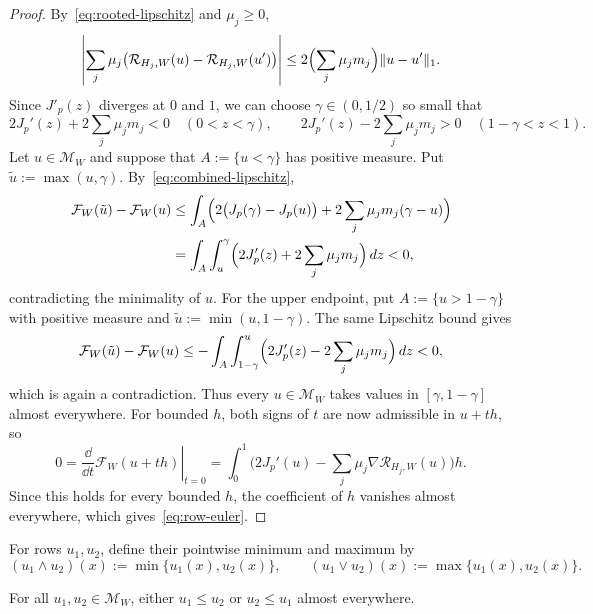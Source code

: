 \begin{proof}
By~\eqref{eq:rooted-lipschitz} and $\mu_j\ge0$,
\begin{equation}\label{eq:combined-lipschitz}
  \left|\sum_j\mu_j\bigl(\mathcal R_{H_j,W}(u)-\mathcal R_{H_j,W}(u')\bigr)\right|
  \le2\Bigl(\sum_j\mu_jm_j\Bigr)\|u-u'\|_1.
\end{equation}
Since $J'_p(z)$ diverges at $0$ and $1$, we can choose $\gamma\in(0,1/2)$ so small that
\[
  2J_p'(z)+2\sum_j\mu_jm_j<0\quad(0<z<\gamma),\qquad
  2J_p'(z)-2\sum_j\mu_jm_j>0\quad(1-\gamma<z<1).
\]
Let
$u\in\mathcal M_W$ and suppose that $A:=\{u<\gamma\}$ has positive measure.
Put $\tilde u:=\max(u,\gamma)$.  By~\eqref{eq:combined-lipschitz},
\begin{align*}
  \mathcal F_W(\tilde u)-\mathcal F_W(u)
  &\le\int_A\Bigl(2\bigl(J_p(\gamma)-J_p(u)\bigr)
       +2\sum_j\mu_jm_j(\gamma-u)\Bigr)\\
  &=\int_A\int_u^\gamma\Bigl(2J_p'(z)+2\sum_j\mu_jm_j\Bigr)\,d z<0,
\end{align*}
contradicting the minimality of $u$.  For the upper endpoint, put
$A:=\{u>1-\gamma\}$ with positive measure and $\tilde u:=\min(u,1-\gamma)$.
The same Lipschitz bound gives
\[
  \mathcal F_W(\tilde u)-\mathcal F_W(u)
  \le-\int_A\int_{1-\gamma}^{u}
       \Bigl(2J_p'(z)-2\sum_j\mu_jm_j\Bigr)\,d z<0,
\]
which is again a contradiction.
Thus every $u\in \mathcal M_W$ takes values in $[\gamma,1-\gamma]$ almost everywhere.
For bounded $h$, both signs of $t$ are now admissible in $u+th$, so
\[
  0=\left.\frac{\dd}{\dd t}\mathcal F_W(u+th)\right|_{t=0}
   =\int_0^1\bigl(2J_p'(u)
       -\sum_j\mu_j\nabla\mathcal R_{H_j,W}(u)\bigr)h.
\]
Since this holds for every bounded $h$, the coefficient of $h$ vanishes
almost everywhere, which gives~\eqref{eq:row-euler}.
\end{proof}

For rows $u_1,u_2$, define their pointwise minimum and maximum by
\[
  (u_1\wedge u_2)(x):=\min\{u_1(x),u_2(x)\},\qquad
  (u_1\vee u_2)(x):=\max\{u_1(x),u_2(x)\}.
\]

\begin{prop}\label{prop:row-ordering}
For all $u_1,u_2\in\mathcal M_W$, either $u_1\le u_2$ or $u_2\le u_1$ almost everywhere.
\end{prop}

